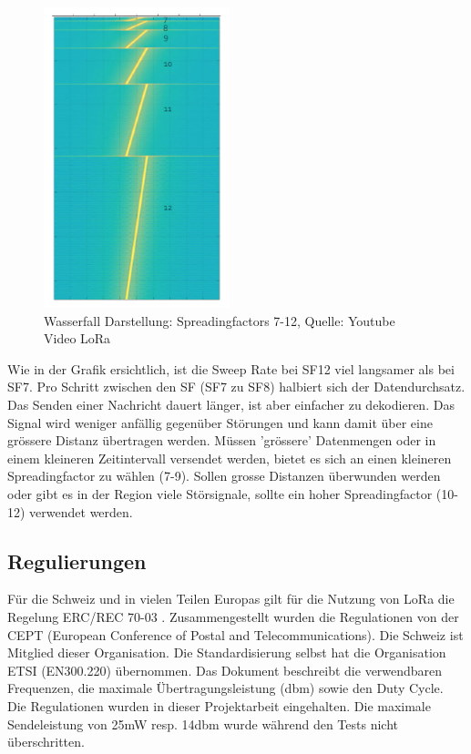 \documentclass[11pt,english,german]{report}
\theoremstyle{definition}
\begin{document}
\begin{figure}[H]
	\centering
	\includegraphics[width=0.48\textwidth]{img/lora/spreadingfactors.jpg}
	\caption[Wasserfall Darstellung: Spreadingfactors 7-12]
	{Wasserfall Darstellung: Spreadingfactors 7-12, Quelle: Youtube Video LoRa \cite{lorabandwidth}}
\end{figure}

\noindent
Wie in der Grafik ersichtlich, ist die Sweep Rate bei SF12 viel langsamer als bei SF7. Pro Schritt zwischen den SF (SF7 zu SF8) halbiert sich der Datendurchsatz. Das Senden einer Nachricht dauert länger, ist aber einfacher zu dekodieren. Das Signal wird weniger anfällig gegenüber Störungen und kann damit über eine grössere Distanz übertragen werden. Müssen 'grössere' Datenmengen oder in einem kleineren Zeitintervall versendet werden, bietet es sich an einen kleineren Spreadingfactor zu wählen (7-9). Sollen grosse Distanzen überwunden werden oder gibt es in der Region viele Störsignale, sollte ein hoher Spreadingfactor (10-12) verwendet werden.

\newpage
\subsection{Regulierungen}
Für die Schweiz und in vielen Teilen Europas gilt für die Nutzung von LoRa die Regelung ERC/REC 70-03 \cite{regulations}. Zusammengestellt wurden die Regulationen von der CEPT (European Conference of Postal and Telecommunications). Die Schweiz ist Mitglied dieser Organisation. Die Standardisierung selbst hat die Organisation ETSI (EN300.220) übernommen. Das Dokument beschreibt die verwendbaren Frequenzen, die maximale Übertragungsleistung (dbm) sowie den Duty Cycle.\\[0.3cm]
Die Regulationen wurden in dieser Projektarbeit eingehalten. Die maximale Sendeleistung von 25mW resp. 14dbm wurde während den Tests nicht überschritten.
\end{document}

